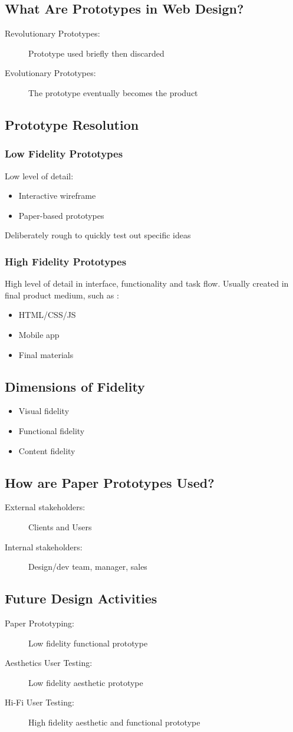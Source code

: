 \subsection{What Are Prototypes in Web Design?}
\begin{description}
	\item[Revolutionary Prototypes:] Prototype used briefly then discarded
	\item[Evolutionary Prototypes:] The prototype eventually becomes the product
\end{description}

\subsection{Prototype Resolution}
\subsubsection{Low Fidelity Prototypes}
Low level of detail:
\begin{itemize}
	\item Interactive wireframe
	\item Paper-based prototypes	
\end{itemize}
Deliberately rough to quickly test out specific ideas
\subsubsection{High Fidelity Prototypes}
High level of detail in interface, functionality and task flow. Usually created in final product medium, such as :
\begin{itemize}
	\item HTML/CSS/JS
	\item Mobile app
	\item Final materials	
\end{itemize}

\subsection{Dimensions of Fidelity}
\begin{itemize}
	\item Visual fidelity
	\item Functional fidelity
	\item Content fidelity	
\end{itemize}

\subsection{How are Paper Prototypes Used?}
\begin{description}
	\item[External stakeholders:] Clients and Users
	\item[Internal stakeholders:] Design/dev team, manager, sales
\end{description}

\subsection{Future Design Activities}
\begin{description}
	\item[Paper Prototyping:] Low fidelity functional prototype
	\item[Aesthetics User Testing:] Low fidelity aesthetic prototype
	\item[Hi-Fi User Testing:] High fidelity aesthetic and functional prototype
\end{description}